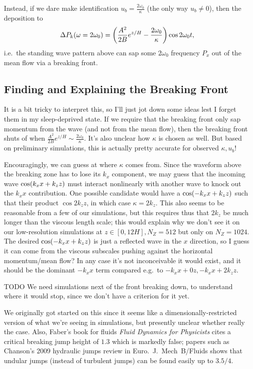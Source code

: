 \documentclass[11pt,
        usenames, %
        dvipsnames %
    ]{report}
\DeclarePairedDelimiter\p{\lparen}{\rparen}
\begin{document}
Instead, if we dare make identification $u_b = \frac{2\omega_0}{\kappa}$ (the
only way $u_b \neq 0$), then the deposition to
\begin{equation}
    \Delta P_k\p*{\omega = 2\omega_0} = \p*{\frac{A^2}{2B}e^{z/H} -
        \frac{2\omega_0}{\kappa}}\cos 2\omega_0 t,
\end{equation}
i.e.\ the standing wave pattern above can sap some $2\omega_0$ frequency $P_x$
out of the mean flow via a breaking front.

\subsection{Finding and Explaining the Breaking Front}

It is a bit tricky to interpret this, so I'll just jot down some ideas lest I
forget them in my sleep-deprived state. If we require that the breaking front
only sap momentum from the wave (and not from the mean flow), then the breaking
front shuts of when $\frac{A^2}{2B}e^{z/H} \sim \frac{2\omega_0}{\kappa}$. It's
also unclear how $\kappa$ is chosen as well. But based on preliminary
simulations, this is actually pretty accurate for observed $\kappa, u_b$!

Encouragingly, we can guess at where $\kappa$ comes from. Since the waveform
above the breaking zone has to lose its $k_x$ component, we may guess that the
incoming wave $\cos \p*{k_xx + k_zz}$ must interact nonlinearly  with another
wave to knock out the $k_xx$ contribution. One possible candidate would have a
$\cos \p*{-k_xx + k_zz}$ such that their product $\cos 2k_zz$, in which case
$\kappa = 2k_z$. This also seems to be reasonable from a few of our simulations,
but this requires thus that $2k_z$ be much longer than the viscous length scale;
this would explain why we don't see it on our low-resolution simulations at $z
\in [0, 12H], N_Z = 512$ but only on $N_Z = 1024$. The desired $\cos \p*{-k_xx +
k_zz}$ is just a reflected wave in the $x$ direction, so I guess it can come
from the viscous subscales pushing against the horizontal momentum/mean flow?
In any case it's not inconceivable it would exist, and it should be the dominant
$-k_xx$ term compared e.g.\ to $-k_xx + 0z, -k_xx + 2k_zz$.

TODO We need simulations next of the front breaking down, to understand where it
would stop, since we don't have a criterion for it yet.

We originally got started on this since it seems like a dimensionally-restricted
version of what we're seeing in simulations, but presently unclear whether
really the case. Also, Faber's book for fluids \emph{Fluid Dynamics for
Physicists} cites a critical breaking jump height of $1.3$ which is markedly
false; papers such as Chanson's 2009 hydraulic jumps review in Euro.\ J.\ Mech\
B/Fluids shows that undular jumps (instead of turbulent jumps) can be found
easily up to $3.5/4$.
\end{document}
